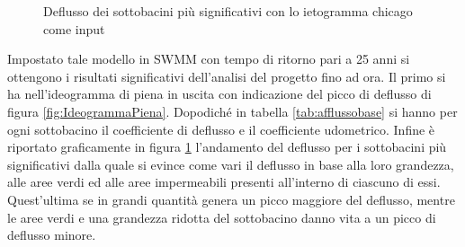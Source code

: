 \begin{figure}[htbp]
    \centering
    \caption{Deflusso dei sottobacini più significativi con lo ietogramma chicago come input}
    \label{fig:DeflussoSottobaciniChicago}
\end{figure}   
Impostato tale modello in SWMM con tempo di ritorno pari a 25 anni si ottengono i risultati significativi dell'analisi del progetto fino ad ora.
Il primo si ha nell'ideogramma di piena in uscita con indicazione del picco di deflusso di figura \ref{fig:IdeogrammaPiena}.
Dopodiché in tabella \ref{tab:afflussobase} si hanno per ogni sottobacino il coefficiente di deflusso e il coefficiente udometrico.
Infine è riportato graficamente in figura \ref{fig:DeflussoSottobaciniChicago} l'andamento del deflusso per i sottobacini più significativi dalla quale si evince come vari il deflusso in base alla loro grandezza, alle aree verdi ed alle aree impermeabili presenti all'interno di ciascuno di essi. 
Quest'ultima se in grandi quantità genera un picco maggiore del deflusso, mentre le aree verdi e una grandezza ridotta del sottobacino danno vita a un picco di deflusso minore.